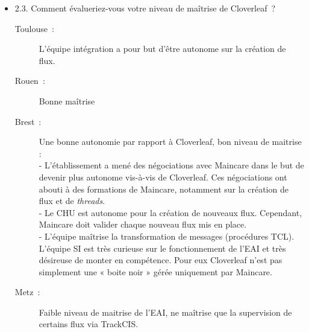 \begin{itemize}
	   \item 2.3. Comment évalueriez-vous votre niveau de maîtrise de Cloverleaf~?
	   \begin{description}
	  	\item[Toulouse~:] L’équipe intégration a pour but d’être autonome sur la
	  	création de flux.
	  	\item[Rouen~:] Bonne maîtrise
	  	\item[Brest~:] Une bonne autonomie par rapport à Cloverleaf, bon niveau de
	  	maitrise :\\
		-	L’établissement a mené des négociations avec Maincare dans le but de
		devenir plus autonome vis-à-vis de Cloverleaf. Ces négociations ont
		abouti à des formations de Maincare, notamment sur la création de flux et de
		\textit{threads}.\\
		-	Le CHU est autonome pour la création de nouveaux flux. Cependant, Maincare
		doit valider chaque nouveau flux mis en place.\\
		-	L’équipe maîtrise la transformation de messages (procédures TCL).\\
		L’équipe SI est très curieuse sur le fonctionnement de l’EAI et très
		désireuse de monter en compétence. Pour eux Cloverleaf n’est pas simplement
		une « boite noir » gérée uniquement par Maincare.
	  	\item[Metz~:] Faible niveau de maitrise de l’EAI, ne maîtrise que la
	  	supervision de certains flux via TrackCIS.
	  \end{description}
	  

\end{itemize}
